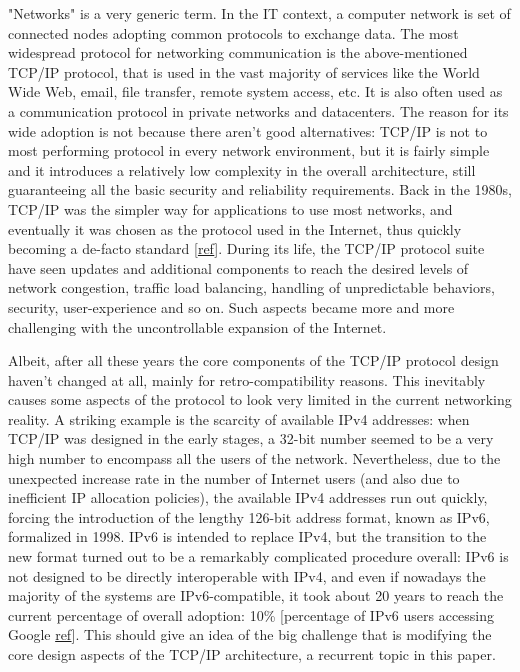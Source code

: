 "Networks" is a very generic term. In the IT context, a computer network is set of connected nodes adopting common protocols to exchange data. The most widespread protocol for networking communication is the above-mentioned TCP/IP protocol, that is used in the vast majority of services like the World Wide Web, email, file transfer, remote system access, etc. It is also often used as a communication protocol in private networks and datacenters.
The reason for its wide adoption is not because there aren't good alternatives: TCP/IP is not to most performing protocol in every network environment, but it is fairly simple and it introduces a relatively low complexity in the overall architecture, still guaranteeing all the basic security and reliability requirements. Back in the 1980s, TCP/IP was the simpler way for applications to use most networks, and eventually it was chosen as the protocol used in the Internet, thus quickly becoming a de-facto standard [\href{http://www.computerworld.com/article/2593612/networking/tcp-ip.html}{ref}]. 
During its life, the TCP/IP protocol suite have seen updates and additional components to reach the desired levels of network congestion, traffic load balancing, handling of unpredictable behaviors, security, user-experience and so on. Such aspects became more and more challenging with the uncontrollable expansion of the Internet. 


Albeit, after all these years the core components of the TCP/IP protocol design haven't changed at all, mainly for retro-compatibility reasons. This inevitably causes some aspects of the protocol to look very limited in the current networking reality. A striking example is the scarcity of available IPv4 addresses: when TCP/IP was designed in the early stages, a 32-bit number seemed to be a very high number to encompass all the users of the network. Nevertheless, due to the unexpected increase rate in the number of Internet users (and also due to inefficient IP allocation policies), the available IPv4 addresses run out quickly, forcing the introduction of the lengthy 126-bit address format, known as IPv6, formalized in 1998. IPv6 is intended to replace IPv4, but the transition to the new format turned out to be a remarkably complicated procedure overall: IPv6 is not designed to be directly interoperable with IPv4, and even if nowadays the majority of the systems are IPv6-compatible, it took about 20 years to reach the current percentage of overall adoption: 10\% [percentage of IPv6 users accessing Google \href{http://www.google.com/intl/en/ipv6/statistics.html#tab=ipv6-adoption&tab=ipv6-adoption}{ref}]. This should give an idea of the big challenge that is modifying the core design aspects of the TCP/IP architecture, a recurrent topic in this paper.

